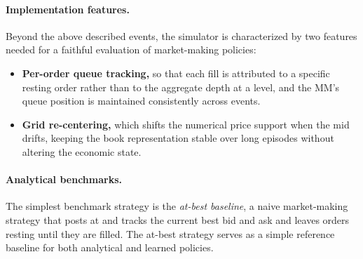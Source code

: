 \documentclass[11pt,a4paper]{article}
\begin{document}
\paragraph{Implementation features.}
Beyond the above described events, the simulator is characterized by two
features needed for a faithful evaluation of market-making policies:
\begin{itemize}[leftmargin=1.2em,itemsep=1pt,topsep=2pt]
\item \textbf{Per-order queue tracking,} so that each fill is
  attributed to a specific resting order rather than to the aggregate
  depth at a level, and the MM's queue position is maintained
  consistently across events.
\item \textbf{Grid re-centering,} which shifts the numerical price
  support when the mid drifts, keeping the book representation stable
  over long episodes without altering the economic state.
\end{itemize}

\paragraph{Analytical benchmarks.}
The simplest benchmark strategy is the \emph{at-best baseline}, a
naive market-making strategy that posts at and
tracks the current best bid and ask and leaves orders resting until
they are filled. The at-best strategy serves as a simple reference
baseline for both analytical and learned policies.
\end{document}
